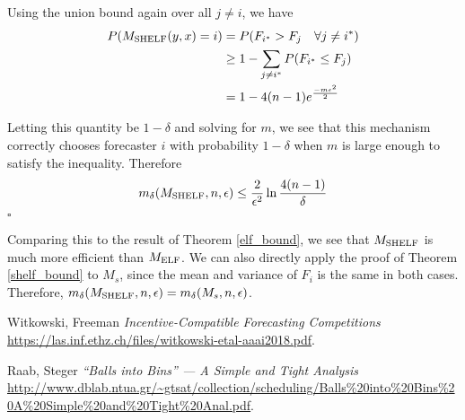 \documentclass[letterpaper,12pt]{article}
\newcommand{\1}{\mathbbm{1}}
\newcommand*{\QED}{\hfill\ensuremath{\square}}%
\begin{document}
Using the union bound again over all $j \neq i$, we have 
\begin{align*}
  P(M_{\mathrm{SHELF}}(y, x) = i) &= P(F_{i^*} > F_j \quad \forall j \neq i^*) \\
                      &\geq 1 - \sum_{j\neq i^*} P(F_{i^*} \leq F_j) \\
                      &= 1 - 4 (n-1) e^{\frac{- m \epsilon^2}{2}}
\end{align*}

Letting this quantity be $1 - \delta$ and solving for $m$, we see that this mechanism correctly chooses forecaster $i$ with probability $1 - \delta$ when $m$ is large enough to satisfy the inequality. Therefore
\[ m_\delta(M_{\mathrm{SHELF}}, n, \epsilon) \leq \frac{2}{\epsilon^2} \ln \frac{4(n-1)}{\delta} \]
\hfill \QED

Comparing this to the result of Theorem \ref{elf_bound}, we see that $M_{\mathrm{SHELF}}$ is much more efficient than $M_{\mathrm{ELF}}$. We can also directly apply the proof of Theorem \ref{shelf_bound} to $M_s$, since the mean and variance of $F_i$ is the same in both cases. Therefore, $m_\delta(M_{\mathrm{SHELF}}, n, \epsilon) = m_\delta(M_s, n, \epsilon)$. 


\begin{thebibliography}{99}
 Witkowski, Freeman  \emph{Incentive-Compatible Forecasting Competitions} \url{https://las.inf.ethz.ch/files/witkowski-etal-aaai2018.pdf}.

 Raab, Steger  \emph{“Balls into Bins” — A Simple and Tight Analysis} \url{http://www.dblab.ntua.gr/~gtsat/collection/scheduling/Balls%20into%20Bins%20A%20Simple%20and%20Tight%20Anal.pdf}.

\end{thebibliography}
\end{document}
